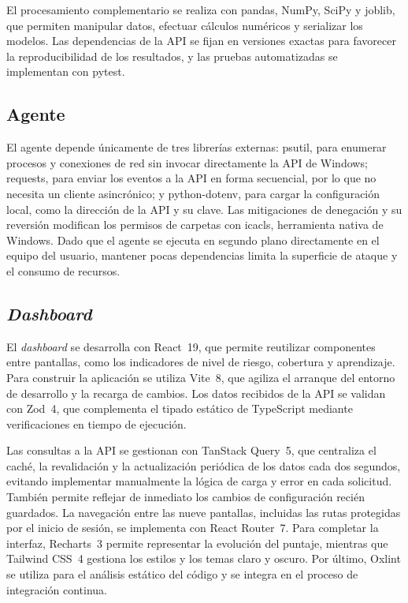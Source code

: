 El procesamiento complementario se realiza con pandas, NumPy, SciPy y joblib, que permiten manipular datos, efectuar cálculos numéricos y serializar los modelos. Las dependencias de la API se fijan en versiones exactas para favorecer la reproducibilidad de los resultados, y las pruebas automatizadas se implementan con pytest.

\subsection{Agente}
El agente depende únicamente de tres librerías externas: psutil, para enumerar procesos y conexiones de red sin invocar directamente la API de Windows; requests, para enviar los eventos a la API en forma secuencial, por lo que no necesita un cliente asincrónico; y python-dotenv, para cargar la configuración local, como la dirección de la API y su clave. Las mitigaciones de denegación y su reversión modifican los permisos de carpetas con icacls, herramienta nativa de Windows. Dado que el agente se ejecuta en segundo plano directamente en el equipo del usuario, mantener pocas dependencias limita la superficie de ataque y el consumo de recursos.

\subsection{\emph{Dashboard}}
El \emph{dashboard} se desarrolla con React~19, que permite reutilizar componentes entre pantallas, como los indicadores de nivel de riesgo, cobertura y aprendizaje. Para construir la aplicación se utiliza Vite~8, que agiliza el arranque del entorno de desarrollo y la recarga de cambios. Los datos recibidos de la API se validan con Zod~4, que complementa el tipado estático de TypeScript mediante verificaciones en tiempo de ejecución.

Las consultas a la API se gestionan con TanStack Query~5, que centraliza el caché, la revalidación y la actualización periódica de los datos cada dos segundos, evitando implementar manualmente la lógica de carga y error en cada solicitud. También permite reflejar de inmediato los cambios de configuración recién guardados. La navegación entre las nueve pantallas, incluidas las rutas protegidas por el inicio de sesión, se implementa con React Router~7. Para completar la interfaz, Recharts~3 permite representar la evolución del puntaje, mientras que Tailwind CSS~4 gestiona los estilos y los temas claro y oscuro. Por último, Oxlint se utiliza para el análisis estático del código y se integra en el proceso de integración continua.

